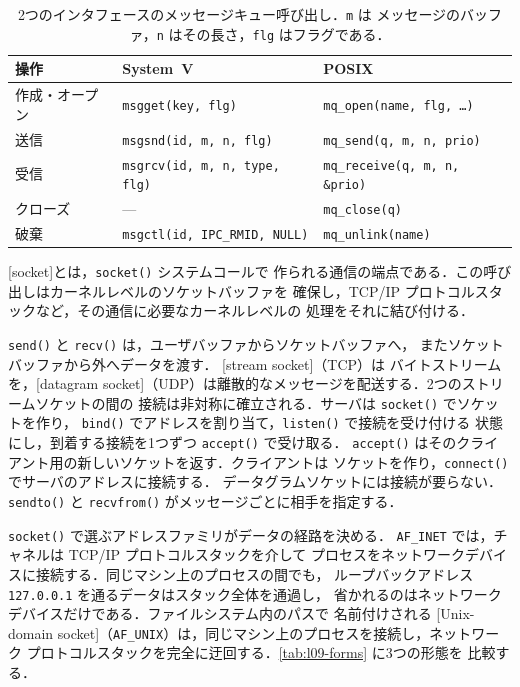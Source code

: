 \documentclass[../main.tex]{subfiles}
\begin{document}
\begin{table}[htbp]
  \centering
  \caption{2つのインタフェースのメッセージキュー呼び出し．\texttt{m} は
    メッセージのバッファ，\texttt{n} はその長さ，\texttt{flg} はフラグである．}
  \label{tab:l09-mq-api}
  \small
  \setlength{\tabcolsep}{4pt}%
  \begin{tabular}{@{}lll@{}}
    \toprule
    操作 & System~V & POSIX \\
    \midrule
    作成・オープン & \texttt{msgget(key, flg)} & \texttt{mq\_open(name, flg, \ldots)} \\
    送信 & \texttt{msgsnd(id, m, n, flg)} & \texttt{mq\_send(q, m, n, prio)} \\
    受信 & \texttt{msgrcv(id, m, n, type, flg)} & \texttt{mq\_receive(q, m, n, \&prio)} \\
    クローズ & --- & \texttt{mq\_close(q)} \\
    破棄 & \texttt{msgctl(id, IPC\_RMID, NULL)} & \texttt{mq\_unlink(name)} \\
    \bottomrule
  \end{tabular}
\end{table}

\begin{definition}[ソケット]
  [socket]とは，\texttt{socket()} システムコールで
  作られる通信の端点である．この呼び出しはカーネルレベルのソケットバッファを
  確保し，TCP/IP プロトコルスタックなど，その通信に必要なカーネルレベルの
  処理をそれに結び付ける．
\end{definition}

\texttt{send()} と \texttt{recv()} は，ユーザバッファからソケットバッファへ，
またソケットバッファから外へデータを渡す．
[stream socket]（TCP）は
バイトストリームを，[datagram
socket]（UDP）は離散的なメッセージを配送する．2つのストリームソケットの間の
接続は非対称に確立される．サーバは \texttt{socket()} でソケットを作り，
\texttt{bind()} でアドレスを割り当て，\texttt{listen()} で接続を受け付ける
状態にし，到着する接続を1つずつ \texttt{accept()} で受け取る．
\texttt{accept()} はそのクライアント用の新しいソケットを返す．クライアントは
ソケットを作り，\texttt{connect()} でサーバのアドレスに接続する．
データグラムソケットには接続が要らない．\texttt{sendto()} と
\texttt{recvfrom()} がメッセージごとに相手を指定する．

\texttt{socket()} で選ぶアドレスファミリがデータの経路を決める．
\texttt{AF\_INET} では，チャネルは TCP/IP プロトコルスタックを介して
プロセスをネットワークデバイスに接続する．同じマシン上のプロセスの間でも，
ループバックアドレス \texttt{127.0.0.1} を通るデータはスタック全体を通過し，
省かれるのはネットワークデバイスだけである．ファイルシステム内のパスで
名前付けされる [Unix-domain
socket]（\texttt{AF\_UNIX}）は，同じマシン上のプロセスを接続し，ネットワーク
プロトコルスタックを完全に迂回する．\cref{tab:l09-forms} に3つの形態を
比較する．
\end{document}
